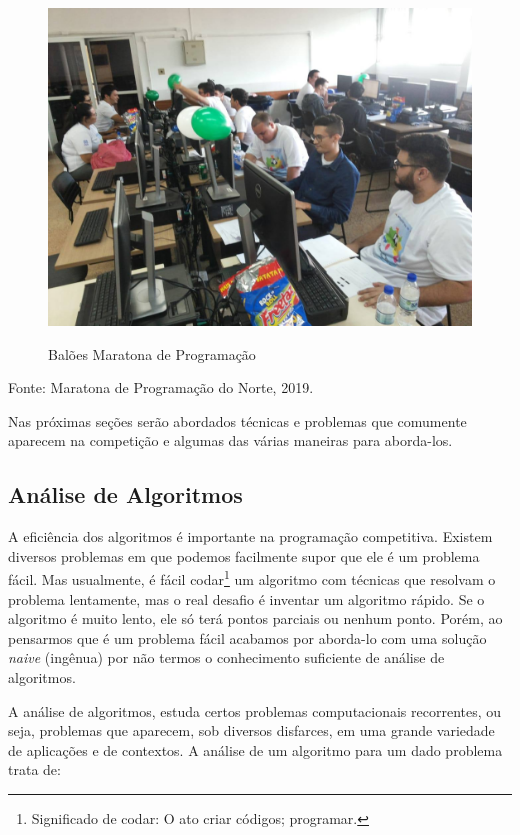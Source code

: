 \begin{figure}[H]
    \caption{Balões Maratona de Programação}    
    \centering
    \includegraphics[scale = 0.2]{image/balao.jpg}
    \label{fig:balao}
\end{figure}
\begin{center}
    Fonte: Maratona de Programação do Norte, 2019.
\end{center}

Nas próximas seções serão abordados técnicas e problemas que comumente aparecem na competição e algumas das várias maneiras para aborda-los.



\subsection{Análise de Algoritmos} %

A eficiência dos algoritmos é importante na programação competitiva. Existem diversos problemas em que podemos facilmente supor que ele é um problema fácil. Mas usualmente, é fácil codar\footnote{Significado de codar: O ato criar códigos; programar.} um algoritmo com técnicas que resolvam o problema lentamente, mas o real desafio é inventar um algoritmo rápido. Se o algoritmo é muito lento, ele só terá pontos parciais ou nenhum ponto. Porém, ao pensarmos que é um problema fácil acabamos por aborda-lo com uma solução \textit{naive} (ingênua) por não termos o conhecimento suficiente de análise de algoritmos. 

A análise de algoritmos, estuda certos problemas computacionais recorrentes, ou seja, problemas que aparecem, sob diversos disfarces, em uma grande variedade de aplicações e de contextos. A análise de um algoritmo para um dado problema trata de:

